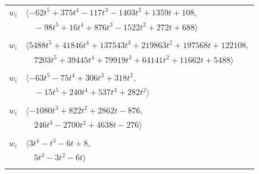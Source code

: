\documentclass[11pt]{article}
\begin{document}
\begin{longtable}{@{}ll@{}}
$w_i$ & $\langle -62t^{5}+375t^{4}-117t^{3}-1403t^{2}+1359t+108,$\\
 & $\quad -98t^{5}+16t^{4}+876t^{3}-1522t^{2}+272t+688\rangle$\\
\addlinespace[2pt]
\multicolumn{2}{@{}p{0.97\textwidth}@{}}{$i=91$, $D_i=343$, $\rho_{ij}$: $4{:}1, \allowbreak 18{:}1, \allowbreak 26{:}1, \allowbreak 37{:}1, \allowbreak 67{:}2, \allowbreak 77{:}2, \allowbreak 81{:}2, \allowbreak 88{:}2, \allowbreak 92{:}2$}\\
$w_i$ & $\langle 5488t^{5}+41846t^{4}+137543t^{3}+219863t^{2}+197568t+122108,$\\
 & $\quad 7203t^{5}+39445t^{4}+79919t^{3}+64141t^{2}+11662t+5488\rangle$\\
\addlinespace[2pt]
\multicolumn{2}{@{}p{0.97\textwidth}@{}}{$i=92$, $D_i=1$, $\rho_{ij}$: $2{:}1, \allowbreak 3{:}2, \allowbreak 5{:}2, \allowbreak 66{:}2, \allowbreak 80{:}2, \allowbreak 91{:}1$}\\
$w_i$ & $\langle -63t^{5}-75t^{4}+306t^{3}+318t^{2},$\\
 & $\quad -15t^{5}+240t^{4}+537t^{3}+282t^{2}\rangle$\\
\addlinespace[2pt]
\multicolumn{2}{@{}p{0.97\textwidth}@{}}{$i=93$, $D_i=1$, $\rho_{ij}$: $1{:}2, \allowbreak 3{:}1, \allowbreak 27{:}1, \allowbreak 37{:}2, \allowbreak 40{:}1, \allowbreak 50{:}1, \allowbreak 52{:}1, \allowbreak 55{:}2, \allowbreak 61{:}2, \allowbreak 65{:}1, \allowbreak 68{:}2, \allowbreak 76{:}1, \allowbreak 79{:}1$}\\
$w_i$ & $\langle -1080t^{3}+822t^{2}+2862t-876,$\\
 & $\quad 246t^{3}-2700t^{2}+4638t-276\rangle$\\
\addlinespace[2pt]
\multicolumn{2}{@{}p{0.97\textwidth}@{}}{$i=94$, $D_i=1$, $\rho_{ij}$: $0{:}1, \allowbreak 17{:}2, \allowbreak 19{:}2, \allowbreak 34{:}2, \allowbreak 40{:}1, \allowbreak 65{:}2, \allowbreak 70{:}1, \allowbreak 79{:}1, \allowbreak 90{:}1$}\\
$w_i$ & $\langle 3t^{4}-t^{3}-6t+8,$\\
 & $\quad 5t^{3}-3t^{2}-6t\rangle$\\
\addlinespace[2pt]
\multicolumn{2}{@{}p{0.97\textwidth}@{}}{$i=95$, $D_i=1$, $\rho_{ij}$: $1{:}2, \allowbreak 2{:}2, \allowbreak 11{:}2, \allowbreak 16{:}2, \allowbreak 34{:}1, \allowbreak 36{:}1, \allowbreak 51{:}1, \allowbreak 65{:}1, \allowbreak 68{:}2, \allowbreak 71{:}1, \allowbreak 72{:}1, \allowbreak 73{:}2, \allowbreak 77{:}2, \allowbreak 81{:}2$}\\

\end{longtable}
\end{document}
